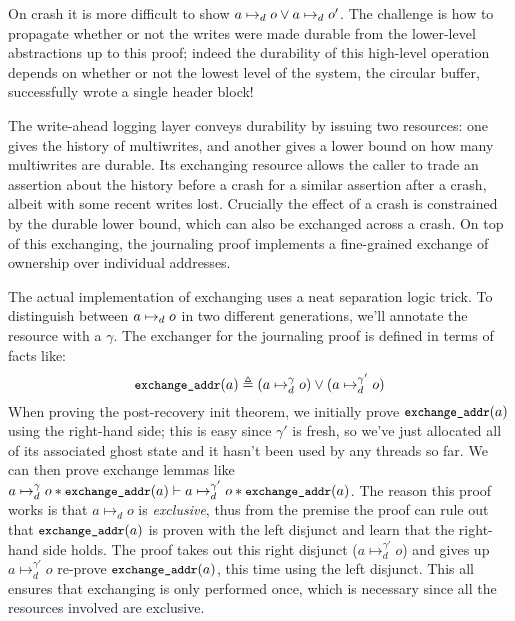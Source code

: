 On crash it is more difficult to show $a \mapsto_d o \lor a \mapsto_d o'$.
The challenge is how to propagate whether or not the writes were made durable
from the lower-level abstractions up to this proof; indeed the durability of
this high-level operation depends on whether or not the lowest level of the
system, the circular buffer, successfully wrote a single header block!

The write-ahead logging layer conveys durability by issuing two resources: one
gives the history of multiwrites, and another gives a lower bound on how many
multiwrites are durable. Its exchanging resource allows the caller to trade an
assertion about the history before a crash for a similar assertion after a
crash, albeit with some recent writes lost. Crucially the effect of a crash is
constrained by the durable lower bound, which can also be exchanged across a
crash. On top of this exchanging, the journaling proof implements a fine-grained
exchange of ownership over individual addresses.

The actual implementation of exchanging uses a neat separation logic trick. To
distinguish between $a \mapsto_d o$ in two different generations, we'll
annotate the resource with a $\gamma$. The exchanger for the journaling proof is
defined in terms of facts like:
\[
  \cc{exchange_addr}(a) \defeq (a \mapsto^{\gamma}_{d} o) \lor (a \mapsto^{\gamma'}_{d} o)
\]
When proving the post-recovery init theorem, we initially prove
$\cc{exchange_addr}(a)$ using the right-hand side; this is easy since $\gamma'$
is fresh, so we've just allocated all of its associated ghost state and it
hasn't been used by any threads so far. We can then prove exchange lemmas like
$a \mapsto^{\gamma}_{d} o \sep \cc{exchange_addr}(a) \proves a \mapsto^{\gamma'}_{d} o \sep \cc{exchange_addr}(a)$.
The reason this proof works is that $a \mapsto_{d} o$ is \emph{exclusive}, thus
from the premise the proof can rule out that $\cc{exchange_addr}(a)$ is proven with the
left disjunct and learn that the right-hand side holds. The proof takes out this
right disjunct ($a \mapsto^{\gamma'}_{d} o$) and gives up
$a \mapsto^{\gamma'}_{d} o$ re-prove $\cc{exchange_addr}(a)$, this time using
the left disjunct. This all ensures that exchanging is only performed once,
which is necessary since all the resources involved are exclusive.


